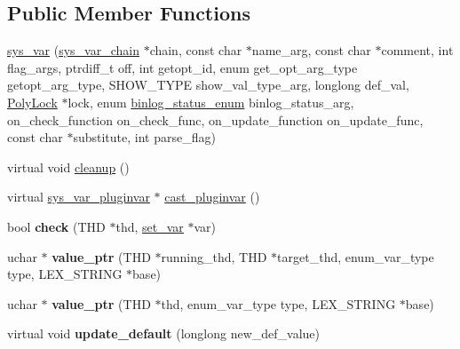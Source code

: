 \subsection*{Public Member Functions}
\begin{DoxyCompactItemize}
\item 
\mbox{\hyperlink{classsys__var_a7a1f7993cd3dc1e34821408fce2c3062}{sys\+\_\+var}} (\mbox{\hyperlink{structsys__var__chain}{sys\+\_\+var\+\_\+chain}} $\ast$chain, const char $\ast$name\+\_\+arg, const char $\ast$comment, int flag\+\_\+args, ptrdiff\+\_\+t off, int getopt\+\_\+id, enum get\+\_\+opt\+\_\+arg\+\_\+type getopt\+\_\+arg\+\_\+type, S\+H\+O\+W\+\_\+\+T\+Y\+PE show\+\_\+val\+\_\+type\+\_\+arg, longlong def\+\_\+val, \mbox{\hyperlink{classPolyLock}{Poly\+Lock}} $\ast$lock, enum \mbox{\hyperlink{classsys__var_a664520ec82191888717c86085bfa83ce}{binlog\+\_\+status\+\_\+enum}} binlog\+\_\+status\+\_\+arg, on\+\_\+check\+\_\+function on\+\_\+check\+\_\+func, on\+\_\+update\+\_\+function on\+\_\+update\+\_\+func, const char $\ast$substitute, int parse\+\_\+flag)
\item 
virtual void \mbox{\hyperlink{classsys__var_a5b6d43884f67de0f40f441d9cf724589}{cleanup}} ()
\item 
virtual \mbox{\hyperlink{classsys__var__pluginvar}{sys\+\_\+var\+\_\+pluginvar}} $\ast$ \mbox{\hyperlink{classsys__var_a88d98571d9c10c74b02ab4edd09a493c}{cast\+\_\+pluginvar}} ()
\item 
\mbox{\label{classsys__var_a36a738532924e071526e0cd1669fdb6e}} 
bool {\bfseries check} (T\+HD $\ast$thd, \mbox{\hyperlink{classset__var}{set\+\_\+var}} $\ast$var)
\item 
\mbox{\label{classsys__var_a661bc68c2a92e2881bb65eb81a1f7028}} 
uchar $\ast$ {\bfseries value\+\_\+ptr} (T\+HD $\ast$running\+\_\+thd, T\+HD $\ast$target\+\_\+thd, enum\+\_\+var\+\_\+type type, L\+E\+X\+\_\+\+S\+T\+R\+I\+NG $\ast$base)
\item 
\mbox{\label{classsys__var_a108a74efbd58168ab656b7746ddbd3ad}} 
uchar $\ast$ {\bfseries value\+\_\+ptr} (T\+HD $\ast$thd, enum\+\_\+var\+\_\+type type, L\+E\+X\+\_\+\+S\+T\+R\+I\+NG $\ast$base)
\item 
\mbox{\label{classsys__var_acaffdf513c0f699fa4d2f706d1229da2}} 
virtual void {\bfseries update\+\_\+default} (longlong new\+\_\+def\+\_\+value)

\end{DoxyCompactItemize}
